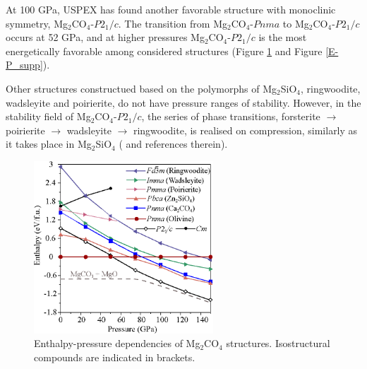 \documentclass[a4paperm]{article}
\begin{document}
At 100 GPa, USPEX has found another favorable structure with monoclinic symmetry, Mg$_2$CO$_4$-$P2_1/c$.
The transition from Mg$_2$CO$_4$-$Pnma$ to Mg$_2$CO$_4$-$P2_1/c$ occurs at 52 GPa, and at higher pressures Mg$_2$CO$_4$-$P2_1/c$ is the most energetically favorable among considered structures (Figure \ref{E-P} and Figure \ref{E-P_supp}). 

Other structures constructued based on the polymorphs of Mg$_2$SiO$_4$, ringwoodite, wadsleyite and poirierite, do not have pressure ranges of stability.
However, in the stability field of Mg$_2$CO$_4$-$P2_1/c$, the series of phase transitions, forsterite $\to$ poirierite $\to$ wadsleyite $\to$ ringwoodite, is realised on compression, similarly as it takes place in Mg$_2$SiO$_4$ (\cite{dorogokupets2015} and references therein).



\begin{figure}[H]
	\includegraphics[width=0.6\textwidth]{E-P_mg2co4} \centering
	\caption{Enthalpy-pressure dependencies of Mg$_2$CO$_4$ structures. Isostructural compounds are indicated in brackets.
} \label{E-P}
\end{figure} 
\end{document}
